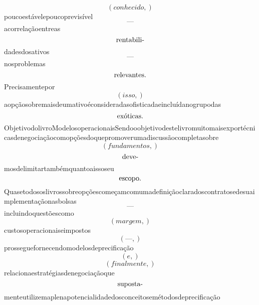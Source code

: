 \documentclass{article}
\begin{document}
\begin{equation}
\left( conhecido,\right)
\end{equation}poucoestávelepoucoprevisível\begin{equation}
—
\end{equation}acorrelaçãoentreas\begin{equation}
$rentabili-$
\end{equation}dadesdosativos\begin{equation}
—
\end{equation}nosproblemas\begin{equation}
$relevantes.$
\end{equation}Precisamentepor\begin{equation}
\left( isso,\right)
\end{equation}aopçãosobremaisdeumativoéconsideradasofisticadaeincluídanogrupodas\begin{equation}
$exóticas.$
\end{equation}ObjetivodolivroModelosoperacionaisSendooobjetivodestelivromuitomaisexportécnicasdenegociaçãocomopçõesdoquepromoverumadiscussãocompletasobre\begin{equation}
\left( fundamentos,\right)
\end{equation}\begin{equation}
$deve-$
\end{equation}mosdelimitartambémquantoaissoseu\begin{equation}
$escopo.$
\end{equation}Quasetodososlivrossobreopçõescomeçamcomumadefiniçãoclaradoscontratosedesuaimplementaçãonasbolsas\begin{equation}
—
\end{equation}incluindoquestõescomo\begin{equation}
\left( margem,\right)
\end{equation}custosoperacionaiseimpostos\begin{equation}
\left( —,\right)
\end{equation}prosseguefornecendomodelosdeprecificação\begin{equation}
\left( e,\right)
\end{equation}\begin{equation}
\left( finalmente,\right)
\end{equation}relacionaestratégiasdenegociaçãoque\begin{equation}
$suposta-$
\end{equation}menteutilizemaplenapotencialidadedosconceitosemétodosdeprecificação\begin{equation}

\end{equation}
\end{document}
